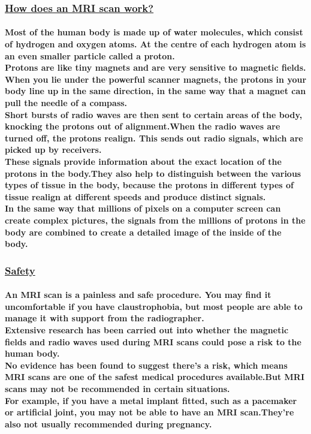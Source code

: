 \documentclass[12pt]{article}
\begin{document}
    \subsubsection{\underline{How does an MRI scan work?}}
    \paragraph{Most of the human body is made up of water molecules, which consist of hydrogen and oxygen atoms. At the centre of each hydrogen atom is an even smaller particle called a proton. \\Protons are like tiny magnets and are very sensitive to magnetic fields.	When you lie under the powerful scanner magnets, the protons in your body line up in the same direction, in the same way that a magnet can pull the needle of a compass.\\Short bursts of radio waves are then sent to certain areas of the body, knocking the protons out of alignment.When the radio waves are turned off, the protons realign. This sends out radio signals, which are picked up by receivers.\\These signals provide information about the exact location of the protons in the body.They also help to distinguish between the various types of tissue in the body, because the protons in different types of tissue realign at different speeds and produce distinct signals.\\In the same way that millions of pixels on a computer screen can create complex pictures, the signals from the millions of protons in the body are combined to create a detailed image of the inside of the body.
    }
    \subsubsection{\underline{Safety}}
    \paragraph{An MRI scan is a painless and safe procedure. You may find it uncomfortable if you have claustrophobia, but most people are able to manage it with support from the radiographer.\\Extensive research has been carried out into whether the magnetic fields and radio waves used during MRI scans could pose a risk to the human body.\\No evidence has been found to suggest there's a risk, which means MRI scans are one of the safest medical procedures available.But MRI scans may not be recommended in certain situations. \\For example, if you have a metal implant fitted, such as a pacemaker or artificial joint, you may not be able to have an MRI scan.They're also not usually recommended during pregnancy.
    }
\end{document}
